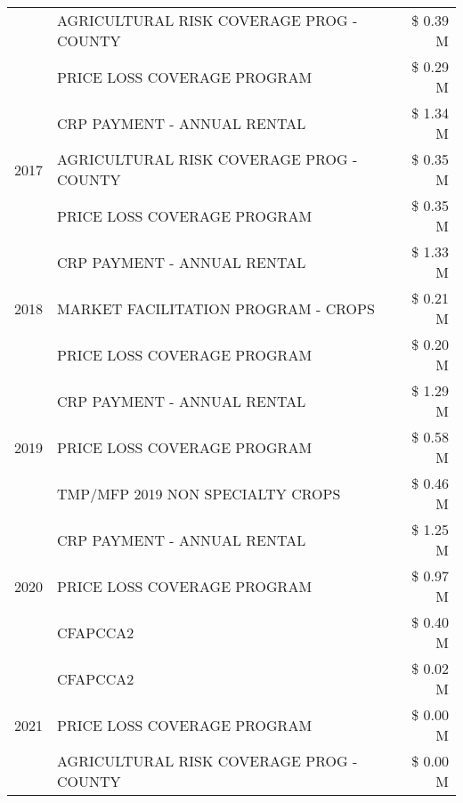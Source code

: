 \begin{tabular}{llr}
 & AGRICULTURAL RISK COVERAGE PROG - COUNTY & \$ 0.39 M \\
 & PRICE LOSS COVERAGE PROGRAM & \$ 0.29 M \\
\cline{1-3}
\multirow[t]{3}{*}{2017} & CRP PAYMENT - ANNUAL RENTAL & \$ 1.34 M \\
 & AGRICULTURAL RISK COVERAGE PROG - COUNTY & \$ 0.35 M \\
 & PRICE LOSS COVERAGE PROGRAM & \$ 0.35 M \\
\cline{1-3}
\multirow[t]{3}{*}{2018} & CRP PAYMENT - ANNUAL RENTAL & \$ 1.33 M \\
 & MARKET FACILITATION PROGRAM - CROPS & \$ 0.21 M \\
 & PRICE LOSS COVERAGE PROGRAM & \$ 0.20 M \\
\cline{1-3}
\multirow[t]{3}{*}{2019} & CRP PAYMENT - ANNUAL RENTAL & \$ 1.29 M \\
 & PRICE LOSS COVERAGE PROGRAM & \$ 0.58 M \\
 & TMP/MFP 2019 NON SPECIALTY CROPS & \$ 0.46 M \\
\cline{1-3}
\multirow[t]{3}{*}{2020} & CRP PAYMENT - ANNUAL RENTAL & \$ 1.25 M \\
 & PRICE LOSS COVERAGE PROGRAM & \$ 0.97 M \\
 & CFAPCCA2 & \$ 0.40 M \\
\cline{1-3}
\multirow[t]{3}{*}{2021} & CFAPCCA2 & \$ 0.02 M \\
 & PRICE LOSS COVERAGE PROGRAM & \$ 0.00 M \\
 & AGRICULTURAL RISK COVERAGE PROG - COUNTY & \$ 0.00 M \\
\cline{1-3}
\bottomrule
\end{tabular}
